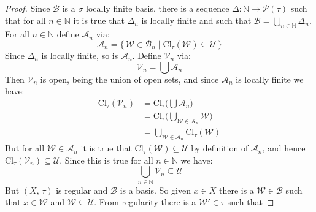 \documentclass{article}
\theoremstyle{plain}
\theoremstyle{normal}
\begin{document}
        \begin{proof}
            Since $\mathcal{B}$ is a $\sigma$ locally finite basis, there is a
            sequence $\Delta:\mathbb{N}\rightarrow\mathcal{P}(\tau)$ such that
            for all $n\in\mathbb{N}$ it is true that $\Delta_{n}$ is locally
            finite and such that
            $\mathcal{B}=\bigcup_{n\in\mathbb{N}}\Delta_{n}$. For all
            $n\in\mathbb{N}$ define $\mathcal{A}_{n}$ via:
            \begin{equation}
                \mathcal{A}_{n}=
                \{\,\mathcal{W}\in\mathcal{B}_{n}\;|\;
                    \textrm{Cl}_{\tau}(\mathcal{W})\subseteq\mathcal{U}\,\}
            \end{equation}
            Since $\Delta_{n}$ is locally finite, so is $\mathcal{A}_{n}$.
            Define $\mathcal{V}_{n}$ via:
            \begin{equation}
                \mathcal{V}_{n}=\bigcup\mathcal{A}_{n}
            \end{equation}
            Then $\mathcal{V}_{n}$ is open, being the union of open sets, and
            since $\mathcal{A}_{n}$ is locally finite we have:
            \begin{align}
                \textrm{Cl}_{\tau}(\mathcal{V}_{n})
                &=\textrm{Cl}_{\tau}\Big(\bigcup\mathcal{A}_{n}\Big)\\
                &=\textrm{Cl}_{\tau}\Big(
                    \bigcup_{\mathcal{W}\in\mathcal{A}_{n}}\mathcal{W}\Big)\\
                &=\bigcup_{\mathcal{W}\in\mathcal{A}_{n}}
                    \textrm{Cl}_{\tau}(\mathcal{W})
            \end{align}
            But for all $\mathcal{W}\in\mathcal{A}_{n}$ it is true that
            $\textrm{Cl}_{\tau}(\mathcal{W})\subseteq\mathcal{U}$ by definition
            of $\mathcal{A}_{n}$, and hence
            $\textrm{Cl}_{\tau}(\mathcal{V}_{n})\subseteq\mathcal{U}$. Since
            this is true for all $n\in\mathbb{N}$ we have:
            \begin{equation}
                \bigcup_{n\in\mathbb{N}}\mathcal{V}_{n}\subseteq\mathcal{U}
            \end{equation}
            But $(X,\,\tau)$ is regular and $\mathcal{B}$ is a basis. So given
            $x\in{X}$ there is a $\mathcal{W}\in\mathcal{B}$ such that
            $x\in\mathcal{W}$ and $\mathcal{W}\subseteq\mathcal{U}$. From
            regularity there is a $\mathcal{W}'\in\tau$ such that

\end{proof}
\end{document}
